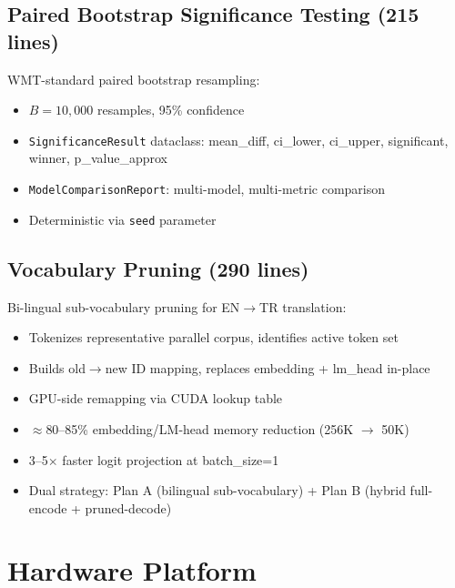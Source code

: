 \documentclass[11pt,a4paper,twoside]{article}
\begin{document}
\subsection{Paired Bootstrap Significance Testing (215 lines)}

WMT-standard paired bootstrap resampling:

\begin{itemize}[nosep]
  \item $B = 10{,}000$ resamples, 95\% confidence
  \item \texttt{SignificanceResult} dataclass: mean\_diff, ci\_lower, ci\_upper,
    significant, winner, p\_value\_approx
  \item \texttt{ModelComparisonReport}: multi-model, multi-metric comparison
  \item Deterministic via \texttt{seed} parameter
\end{itemize}

\subsection{Vocabulary Pruning (290 lines)}

Bi-lingual sub-vocabulary pruning for EN$\rightarrow$TR translation:

\begin{itemize}[nosep]
  \item Tokenizes representative parallel corpus, identifies active token set
  \item Builds old$\rightarrow$new ID mapping, replaces embedding + lm\_head
    in-place
  \item GPU-side remapping via CUDA lookup table
  \item $\approx$80--85\% embedding/LM-head memory reduction (256K $\rightarrow$ 50K)
  \item 3--5$\times$ faster logit projection at batch\_size=1
  \item Dual strategy: Plan A (bilingual sub-vocabulary) + Plan B (hybrid
    full-encode + pruned-decode)
\end{itemize}

\section{Hardware Platform}
\end{document}
